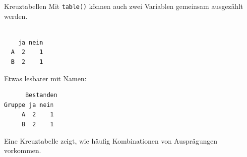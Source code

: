 \documentclass[
  10pt,
  ignorenonframetext,
  aspectratio=169,
]{beamer}
\newenvironment{Shaded}{}{}
\newcommand{\AttributeTok}[1]{\textcolor[rgb]{0.49,0.56,0.16}{#1}}
\newcommand{\FunctionTok}[1]{\textcolor[rgb]{0.02,0.16,0.49}{#1}}
\newcommand{\NormalTok}[1]{#1}
\newcommand{\SpecialCharTok}[1]{\textcolor[rgb]{0.25,0.44,0.63}{#1}}
\begin{document}
\begin{frame}[fragile]{Kreuztabellen}
\label{kreuztabellen}
Mit \texttt{table()} können auch zwei Variablen gemeinsam ausgezählt
werden.

\begin{Shaded}
\end{Shaded}

\begin{verbatim}
   
    ja nein
  A  2    1
  B  2    1
\end{verbatim}

Etwas lesbarer mit Namen:

\begin{Shaded}
\end{Shaded}

\begin{verbatim}
      Bestanden
Gruppe ja nein
     A  2    1
     B  2    1
\end{verbatim}

Eine Kreuztabelle zeigt, wie häufig Kombinationen von Ausprägungen
vorkommen.
\end{frame}
\end{document}

